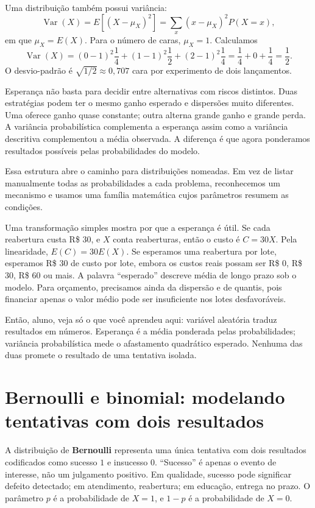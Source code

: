 Uma distribuição também possui variância:
\[
\operatorname{Var}(X)=E[(X-\mu_X)^2]
=\sum_x(x-\mu_X)^2P(X=x),
\]
em que $\mu_X=E(X)$. Para o número de caras, $\mu_X=1$. Calculamos
\[
\operatorname{Var}(X)=(0-1)^2\frac14+(1-1)^2\frac12+(2-1)^2\frac14
=\frac14+0+\frac14=\frac12.
\]
O desvio-padrão é $\sqrt{1/2}\approx0{,}707$ cara por experimento de dois lançamentos.

Esperança não basta para decidir entre alternativas com riscos distintos. Duas estratégias podem ter o mesmo ganho esperado e dispersões muito diferentes. Uma oferece ganho quase constante; outra alterna grande ganho e grande perda. A variância probabilística complementa a esperança assim como a variância descritiva complementou a média observada. A diferença é que agora ponderamos resultados possíveis pelas probabilidades do modelo.

Essa estrutura abre o caminho para distribuições nomeadas. Em vez de listar manualmente todas as probabilidades a cada problema, reconhecemos um mecanismo e usamos uma família matemática cujos parâmetros resumem as condições.

Uma transformação simples mostra por que a esperança é útil. Se cada reabertura custa R\$ 30, e $X$ conta reaberturas, então o custo é $C=30X$. Pela linearidade, $E(C)=30E(X)$. Se esperamos uma reabertura por lote, esperamos R\$ 30 de custo por lote, embora os custos reais possam ser R\$ 0, R\$ 30, R\$ 60 ou mais. A palavra ``esperado'' descreve média de longo prazo sob o modelo. Para orçamento, precisamos ainda da dispersão e de quantis, pois financiar apenas o valor médio pode ser insuficiente nos lotes desfavoráveis.

\begin{SummaryBox}
Então, aluno, veja só o que você aprendeu aqui: variável aleatória traduz resultados em números. Esperança é a média ponderada pelas probabilidades; variância probabilística mede o afastamento quadrático esperado. Nenhuma das duas promete o resultado de uma tentativa isolada.
\end{SummaryBox}

\section[Bernoulli e binomial]{Bernoulli e binomial: modelando tentativas com dois resultados}

A distribuição de \textbf{Bernoulli} representa uma única tentativa com dois resultados codificados como sucesso $1$ e insucesso $0$. ``Sucesso'' é apenas o evento de interesse, não um julgamento positivo. Em qualidade, sucesso pode significar defeito detectado; em atendimento, reabertura; em educação, entrega no prazo. O parâmetro $p$ é a probabilidade de $X=1$, e $1-p$ é a probabilidade de $X=0$.

